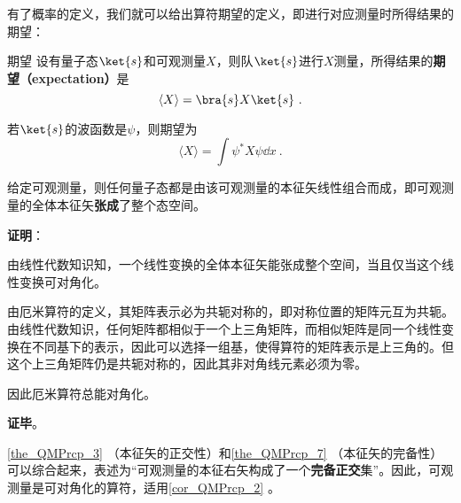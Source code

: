 有了概率的定义，我们就可以给出算符期望的定义，即进行对应测量时所得结果的期望：
\begin{definition}{期望}\label{def_QMPrcp_18}
设有量子态$\ket{s}$和可观测量$X$，则队$\ket{s}$进行$X$测量，所得结果的\textbf{期望（expectation）}是
\begin{equation}
\langle X \rangle = \bra{s}X\ket{s}~.
\end{equation}

若$\ket{s}$的波函数是$\psi$，则期望为
\begin{equation}
\langle X \rangle  = \int \psi^* X \psi \dd x~.
\end{equation}

\end{definition}


\begin{theorem}{}\label{the_QMPrcp_7}
给定可观测量，则任何量子态都是由该可观测量的本征矢线性组合而成，即可观测量的全体本征矢\textbf{张成}了整个态空间。
\end{theorem}

\textbf{证明}：

由线性代数知识知，一个线性变换的全体本征矢能张成整个空间，当且仅当这个线性变换可对角化。

由厄米算符的定义，其矩阵表示必为共轭对称的，即对称位置的矩阵元互为共轭。由线性代数知识，任何矩阵都相似于一个上三角矩阵，而相似矩阵是同一个线性变换在不同基下的表示，因此可以选择一组基，使得算符的矩阵表示是上三角的。但这个上三角矩阵仍是共轭对称的，因此其非对角线元素必须为零。

因此厄米算符总能对角化。

\textbf{证毕}。


\autoref{the_QMPrcp_3} （本征矢的正交性）和\autoref{the_QMPrcp_7} （本征矢的完备性）可以综合起来，表述为“可观测量的本征右矢构成了一个\textbf{完备正交}集”。因此，可观测量是可对角化的算符，适用\autoref{cor_QMPrcp_2} 。










